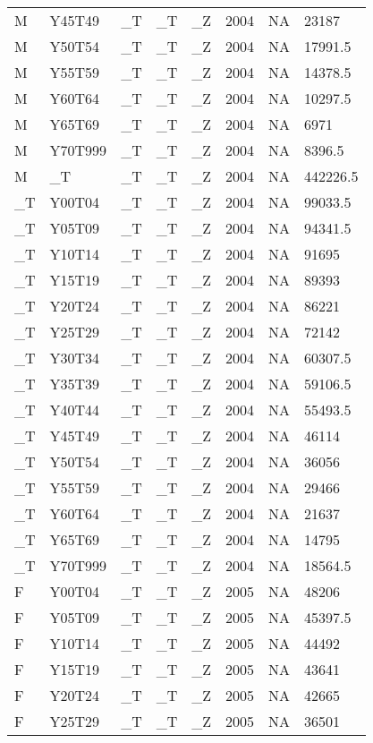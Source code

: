 \begin{longtable}[t]{llllllll}
M & Y45T49 & \_T & \_T & \_Z & 2004 & NA & 23187\\
M & Y50T54 & \_T & \_T & \_Z & 2004 & NA & 17991.5\\
\addlinespace
M & Y55T59 & \_T & \_T & \_Z & 2004 & NA & 14378.5\\
M & Y60T64 & \_T & \_T & \_Z & 2004 & NA & 10297.5\\
M & Y65T69 & \_T & \_T & \_Z & 2004 & NA & 6971\\
M & Y70T999 & \_T & \_T & \_Z & 2004 & NA & 8396.5\\
M & \_T & \_T & \_T & \_Z & 2004 & NA & 442226.5\\
\addlinespace
\_T & Y00T04 & \_T & \_T & \_Z & 2004 & NA & 99033.5\\
\_T & Y05T09 & \_T & \_T & \_Z & 2004 & NA & 94341.5\\
\_T & Y10T14 & \_T & \_T & \_Z & 2004 & NA & 91695\\
\_T & Y15T19 & \_T & \_T & \_Z & 2004 & NA & 89393\\
\_T & Y20T24 & \_T & \_T & \_Z & 2004 & NA & 86221\\
\addlinespace
\_T & Y25T29 & \_T & \_T & \_Z & 2004 & NA & 72142\\
\_T & Y30T34 & \_T & \_T & \_Z & 2004 & NA & 60307.5\\
\_T & Y35T39 & \_T & \_T & \_Z & 2004 & NA & 59106.5\\
\_T & Y40T44 & \_T & \_T & \_Z & 2004 & NA & 55493.5\\
\_T & Y45T49 & \_T & \_T & \_Z & 2004 & NA & 46114\\
\addlinespace
\_T & Y50T54 & \_T & \_T & \_Z & 2004 & NA & 36056\\
\_T & Y55T59 & \_T & \_T & \_Z & 2004 & NA & 29466\\
\_T & Y60T64 & \_T & \_T & \_Z & 2004 & NA & 21637\\
\_T & Y65T69 & \_T & \_T & \_Z & 2004 & NA & 14795\\
\_T & Y70T999 & \_T & \_T & \_Z & 2004 & NA & 18564.5\\
\addlinespace
F & Y00T04 & \_T & \_T & \_Z & 2005 & NA & 48206\\
F & Y05T09 & \_T & \_T & \_Z & 2005 & NA & 45397.5\\
F & Y10T14 & \_T & \_T & \_Z & 2005 & NA & 44492\\
F & Y15T19 & \_T & \_T & \_Z & 2005 & NA & 43641\\
F & Y20T24 & \_T & \_T & \_Z & 2005 & NA & 42665\\
\addlinespace
F & Y25T29 & \_T & \_T & \_Z & 2005 & NA & 36501\\

\end{longtable}
